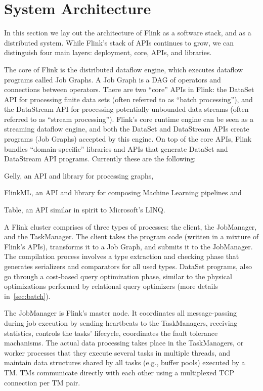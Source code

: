 
\section{System Architecture}

In this section we lay out the architecture of Flink as a software stack, and as a distributed system. While Flink's stack of APIs continues to grow, we can distinguish four main layers: deployment, core, APIs, and libraries.

 The core of Flink is the distributed dataflow engine, which executes dataflow programs called Job Graphs. A Job Graph is a DAG of operators and connections between operators. There are two ``core'' APIs in Flink: the DataSet API for processing finite data sets (often referred to as ``batch processing''), and the DataStream API for processing potentially unbounded data streams (often referred to as ``stream processing''). Flink's core runtime engine can be seen as a streaming dataflow engine, and both the DataSet and DataStream APIs create programs (Job Graphs) accepted by this engine. On top of the core APIs, Flink bundles ``domain-specific'' libraries and APIs that generate DataSet and DataStream API programs. Currently these are the following:
\begin{inparaenum}[i)]
  \item Gelly, an API and library for processing graphs,
  \item FlinkML, an API and library for composing Machine Learning pipelines and
  \item Table, an API similar in spirit to Microsoft's LINQ.
\end{inparaenum}
A Flink cluster comprises of three types of processes: the client, the JobManager, and the TaskManager. The client takes the program code (written in a mixture of Flink's APIs), transforms it to a Job Graph, and submits it to the JobManager. The compilation process involves a type extraction and checking phase that generates serializers and comparators for all used types. DataSet programs, also go through a cost-based query optimization phase, similar to the physical optimizations performed by relational query optimizers (more details in~\autoref{sec:batch}).

The JobManager is Flink's master node. It coordinates all message-passing during job execution by sending heartbeats to the TaskManagers, receiving statistics, controls the tasks' lifecycle,  coordinates the fault tolerance machanisms. The actual data processing takes place in the TaskManagers, or worker processes that they execute several tasks in multiple threads, and maintain data structures shared by all tasks (e.g., buffer pools) executed by a TM. TMs communicate directly with each other using a multiplexed TCP connection per TM pair. 

